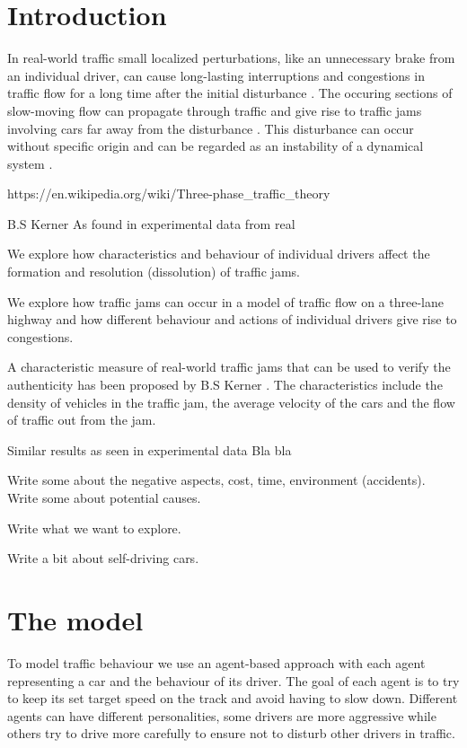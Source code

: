 \documentclass[11pt,a4paper,twocolumn]{article}
\begin{document}
\section{Introduction}
In real-world traffic small localized perturbations, like an unnecessary brake from an individual driver, can cause long-lasting interruptions and congestions in traffic flow for a long time after the initial disturbance \cite{kerner97flow}. The occuring sections of slow-moving flow can propagate through traffic and give rise to traffic jams involving cars far away from the disturbance \cite{kerner96trafficjam}. This disturbance can occur without specific origin and can be regarded as an instability of a dynamical system \cite{bando1995dynamical}. 

https://en.wikipedia.org/wiki/Three-phase\_traffic\_theory

B.S Kerner As found in experimental data from real

We explore how characteristics and behaviour of individual drivers affect the formation and resolution (dissolution) of traffic jams.

We explore how traffic jams can occur in a model of traffic flow on a three-lane highway and how different behaviour and actions of individual drivers give rise to congestions.

A characteristic measure of real-world traffic jams that can be used to verify the authenticity has been proposed by B.S Kerner \cite{kerner96trafficjam}. The characteristics include the density of vehicles in the traffic jam, the average velocity of the cars and the flow of traffic out from the jam.

Similar results as seen in experimental data
Bla bla

Write some about the negative aspects, cost, time, environment (accidents). Write some about potential causes.

Write what we want to explore.

Write a bit about self-driving cars.



\section{The model}
To model traffic behaviour we use an agent-based approach with each agent representing a car and the behaviour of its driver. The goal of each agent is to try to keep its set target speed on the track and avoid having to slow down. Different agents can have different personalities, some drivers are more aggressive while others try to drive more carefully to ensure not to disturb other drivers in traffic.
\end{document}
